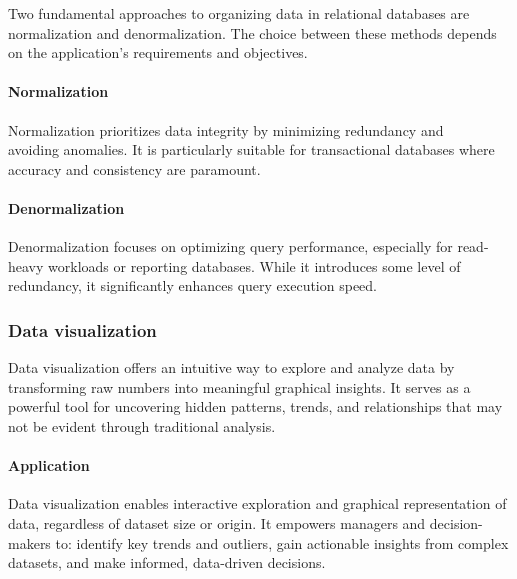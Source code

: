 Two fundamental approaches to organizing data in relational databases are normalization and denormalization. 
The choice between these methods depends on the application's requirements and objectives. 

\paragraph*{Normalization}
Normalization prioritizes data integrity by minimizing redundancy and \\ avoiding anomalies. 
It is particularly suitable for transactional databases where accuracy and consistency are paramount.

\paragraph*{Denormalization}
Denormalization focuses on optimizing query performance, especially for read-heavy workloads or reporting databases.
 While it introduces some level of redundancy, it significantly enhances query execution speed.

\subsubsection{Data visualization}
Data visualization offers an intuitive way to explore and analyze data by transforming raw numbers into meaningful graphical insights. 
It serves as a powerful tool for uncovering hidden patterns, trends, and relationships that may not be evident through traditional analysis.

\paragraph*{Application}
Data visualization enables interactive exploration and graphical representation of data, regardless of dataset size or origin. 
It empowers managers and decision-makers to: identify key trends and outliers, gain actionable insights from complex datasets, and make informed, data-driven decisions.

